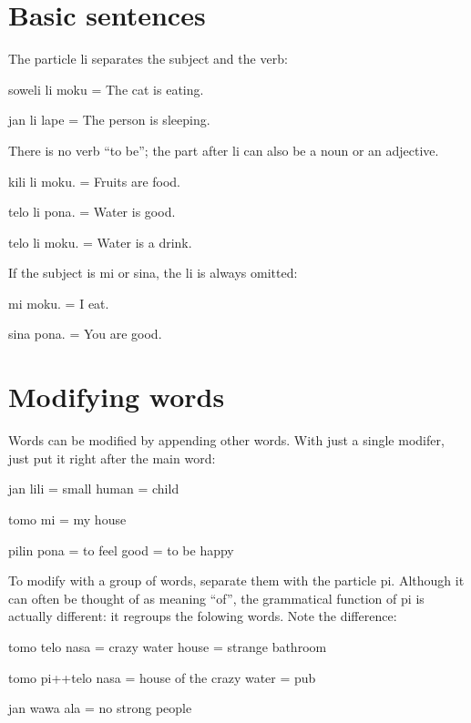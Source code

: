 \documentclass{article}
\newcommand\tp[1]{{\tpf #1}}
\begin{document}
\setlength{\parskip}{0.3em}
\begin{multicols}{2}
\raggedright

\section*{Basic sentences}
The particle \tp{li} separates the subject and the verb:
\begin{ex}
  \tp{soweli li moku} = The cat is eating.

  \tp{jan li lape} = The person is sleeping.
\end{ex}

There is no verb “to be”; the part after \tp{li} can also be
a noun or an adjective.
\begin{ex}
  \tp{kili li moku.} = Fruits are food. 

  {\tpf telo li pona}. = Water is good.

  {\tpf telo li moku}. = Water is a drink.
\end{ex}

If the subject is {\tpf mi} or {\tpf sina}, the {\tpf li}
is always omitted:
\begin{ex}
  {\tpf mi moku}. = I eat.

  {\tpf sina pona}. = You are good.
\end{ex}

\section*{Modifying words }
Words can be modified by appending other words.  With just
a single modifer, just put it right after the main word:
\begin{ex}
  {\tpf jan lili} = small human = child

  {\tpf tomo mi} = my house

  {\tpf pilin pona} = to feel good = to be happy
\end{ex}

To modify with a group of words, separate them with
the particle {\tpf pi}. Although it can often be thought
of as meaning “of”, the grammatical function of {\tpf pi} is
actually different: it regroups the folowing words.
Note the difference:
\begin{ex}
  {\tpf tomo telo nasa} = crazy water house = strange bathroom

  {\tpf tomo pi++telo nasa} = house of the crazy water = pub

  {\tpf jan wawa ala} = no strong people


\end{ex}
\end{multicols}
\end{document}
